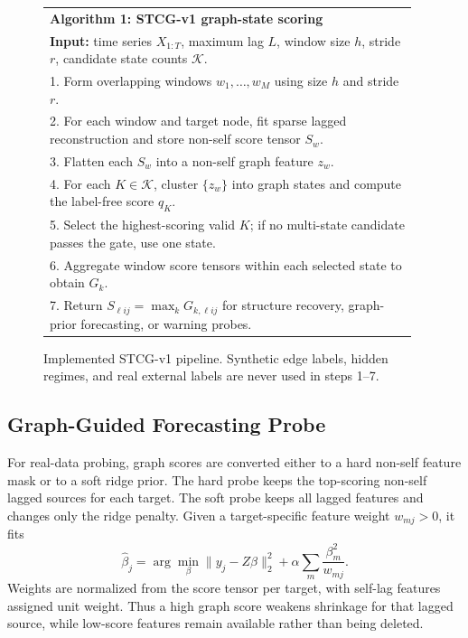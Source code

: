 \documentclass[sigconf,review,anonymous]{acmart}
\begin{document}
\begin{figure}[t]
\centering
\small
\begin{tabular}{p{0.96\linewidth}}
\toprule
\textbf{Algorithm 1: STCG-v1 graph-state scoring} \\
\textbf{Input:} time series $X_{1:T}$, maximum lag $L$, window size $h$, stride $r$, candidate state counts $\mathcal{K}$. \\
1. Form overlapping windows $w_1,\ldots,w_M$ using size $h$ and stride $r$. \\
2. For each window and target node, fit sparse lagged reconstruction and store non-self score tensor $S_w$. \\
3. Flatten each $S_w$ into a non-self graph feature $z_w$. \\
4. For each $K\in\mathcal{K}$, cluster $\{z_w\}$ into graph states and compute the label-free score $q_K$. \\
5. Select the highest-scoring valid $K$; if no multi-state candidate passes the gate, use one state. \\
6. Aggregate window score tensors within each selected state to obtain $G_k$. \\
7. Return $S_{\ell i j}=\max_k G_{k,\ell i j}$ for structure recovery, graph-prior forecasting, or warning probes. \\
\bottomrule
\end{tabular}
\caption{Implemented STCG-v1 pipeline. Synthetic edge labels, hidden regimes, and real external labels are never used in steps 1--7.}
\label{alg:stcg-v1}
\end{figure}

\subsection{Graph-Guided Forecasting Probe}

For real-data probing, graph scores are converted either to a hard non-self feature mask or to a soft ridge prior.
The hard probe keeps the top-scoring non-self lagged sources for each target.
The soft probe keeps all lagged features and changes only the ridge penalty.
Given a target-specific feature weight $w_{mj}>0$, it fits
\[
\hat{\beta}_j
= \arg\min_{\beta}
\|y_j-Z\beta\|_2^2 + \alpha \sum_m \frac{\beta_m^2}{w_{mj}}.
\]
Weights are normalized from the score tensor per target, with self-lag features assigned unit weight.
Thus a high graph score weakens shrinkage for that lagged source, while low-score features remain available rather than being deleted.
\end{document}
